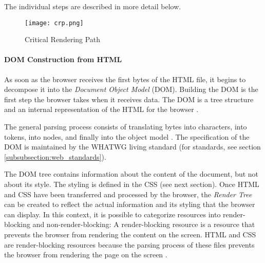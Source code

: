The individual steps are described in more detail below.


\begin{figure}[h!]
\begin{center}
\texttt{[image: crp.png]}
\caption{Critical Rendering Path}
\label{img:crp}
\end{center}
\end{figure}






\paragraph{DOM Construction from HTML} %


As soon as the browser receives the first bytes of the HTML file, it begins to decompose it into the \textit{Document Object Model} (DOM).
Building the DOM is the first step the browser takes when it receives data.
The DOM is a tree structure and an internal representation of the HTML for the browser \cite{2021MDNHowBrowsersWork}.

The general parsing process consists of translating bytes into characters, into tokens, into nodes, and finally into the object model \cite{2019GrigorikDOM}.
The specification of the DOM is maintained by the WHATWG living standard (for standards, see section \ref{subsubsection:web_standards}).




The DOM tree contains information about the content of the document, but not about its style.
The styling is defined in the CSS (see next section).
Once HTML and CSS have been transferred and processed by the browser, the \textit{Render Tree} can be created to reflect the actual information and its styling that the browser can display.
In this context, it is possible to categorize resources into render-blocking and non-render-blocking:
A render-blocking resource is a resource that prevents the browser from rendering the content on the screen.
HTML and CSS are render-blocking resources because the parsing process of these files prevents the browser from rendering the page on the screen \cite{2019GrigorikCSS}.

